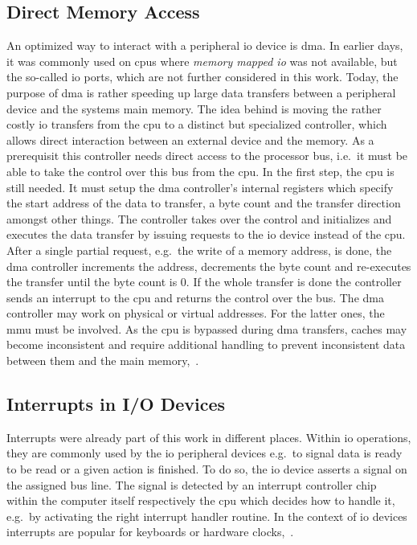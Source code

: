 \subsection{Direct Memory Access}
An optimized way to interact with a peripheral \ac{io} device is \acf{dma}.
In earlier days, it was commonly used on \acp{cpu} where \textit{memory mapped \ac{io}} was not available, but the so-called \ac{io} ports, which are not further considered in this work.
Today, the purpose of \ac{dma} is rather speeding up large data transfers between a peripheral device and the systems main memory.
The idea behind is moving the rather costly \ac{io} transfers from the \ac{cpu} to a distinct but specialized controller, which allows direct interaction between an external device and the memory.
As a prerequisit this controller needs direct access to the processor bus, i.e.\ it must be able to take the control over this bus from the \ac{cpu}.
In the first step, the \ac{cpu} is still needed.
It must setup the \ac{dma} controller's internal registers which specify the start address of the data to transfer, a byte count and the transfer direction amongst other things.
The controller takes over the control and initializes and executes the data transfer by issuing requests to the \ac{io} device instead of the \ac{cpu}.
After a single partial request, e.g.\ the write of a memory address, is done, the \ac{dma} controller increments the address, decrements the byte count and re-executes the transfer until the byte count is 0.
If the whole transfer is done the controller sends an interrupt to the \ac{cpu} and returns the control over the bus.
The \ac{dma} controller may work on physical or virtual addresses.
For the latter ones, the \ac{mmu} must be involved.
As the \ac{cpu} is bypassed during \ac{dma} transfers, caches may become inconsistent and require additional handling to prevent inconsistent data between them and the main memory\cite{tanenbaum-modern-operating-systems},~\cite{glatz2015betriebssysteme}.

\subsection{Interrupts in I/O Devices}
Interrupts were already part of this work in different places.
Within \ac{io} operations, they are commonly used by the \ac{io} peripheral devices e.g.\ to signal data is ready to be read or a given action is finished.
To do so, the \ac{io} device asserts a signal on the assigned bus line.
The signal is detected by an interrupt controller chip within the computer itself respectively the \ac{cpu} which decides how to handle it, e.g.\ by activating the right interrupt handler routine.
In the context of \ac{io} devices interrupts are popular for keyboards or hardware clocks\cite{tanenbaum-modern-operating-systems},~\cite{glatz2015betriebssysteme}.


